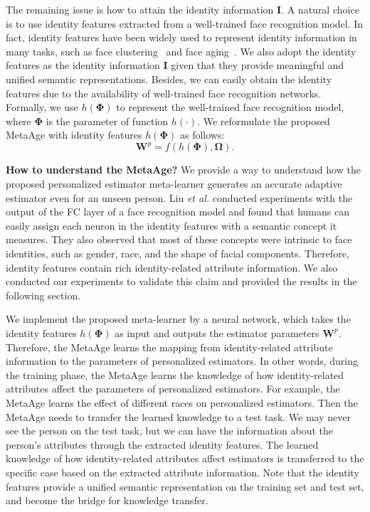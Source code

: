 \documentclass[journal,twoside]{IEEEtran}
\begin{document}
The remaining issue is how to attain the identity information $\bm{I}$. A natural choice is to use identity features extracted from a well-trained face recognition model. In fact, identity features have been widely used to represent identity information in many tasks, such as face clustering~\cite{yang2020learning} and face aging~\cite{liu2019attribute}. We also adopt the identity features as the identity information $\bm{I}$ given that they provide meaningful and  unified semantic representations. Besides, we can easily obtain the identity features due to the availability of well-trained face recognition networks. Formally, we use $h(\bm{\Phi})$ to represent the well-trained face recognition model, where $\bm{\Phi}$ is the parameter of function $h(\cdot)$. We reformulate the proposed MetaAge with identity features $h(\bm{\Phi})$ as follows:
\begin{equation}
\bm{W}^{p} = f(h(\bm{\Phi}),\bm{\Omega}).
\label{equ:AEML}
\end{equation}




\textbf{How to understand the MetaAge?} We provide a way to understand how the proposed personalized estimator meta-learner generates an accurate adaptive estimator even for an unseen person. Liu \emph{et al.} \cite{liu2015deep} conducted experiments with the output of the FC layer of a face recognition model and found that humans can easily assign each neuron in the identity features with a semantic concept it measures. They also observed that most of these concepts were intrinsic to face identities, such as gender, race, and the shape of facial components. Therefore, identity features contain rich identity-related attribute information. We also conducted our experiments to validate this claim and provided the results in the following section.

We implement the proposed meta-learner by a neural network, which takes the identity features $h(\bm{\Phi})$ as input and outputs the estimator parameters $\bm{W}^{p}$. Therefore, the MetaAge learns the mapping from identity-related attribute information to the parameters of personalized estimators. In other words, during the training phase, the MetaAge learns the knowledge of how identity-related attributes affect the parameters of personalized estimators. For example, the MetaAge learns the effect of different races on personalized estimators. Then the MetaAge needs to transfer the learned knowledge to a test task. We may never see the person on the test task, but we can have the information about the person's attributes through the extracted identity features. The learned knowledge of how identity-related attributes affect estimators is transferred to the specific case based on the extracted attribute information. Note that the identity features provide a unified semantic representation on the training set and test set, and become the bridge for knowledge transfer.
\end{document}
